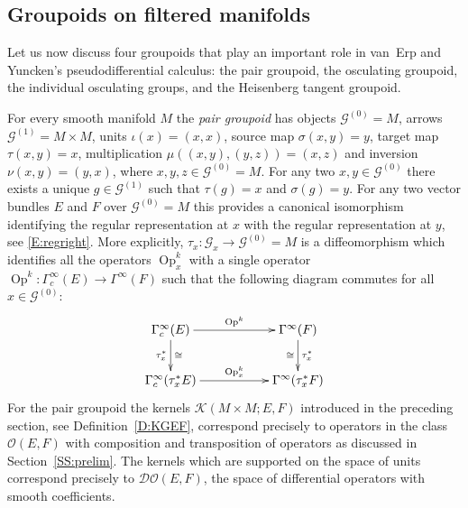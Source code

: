 \documentclass[reqno,12pt]{amsart}
\DeclareMathOperator{\Op}{Op}
\newcommand{\DO}{\mathcal D\mathcal O}
\theoremstyle{plain}
\theoremstyle{definition}
\begin{document}
\subsection{Groupoids on filtered manifolds}






Let us now discuss four groupoids that play an important role in van~Erp and Yuncken's pseudodifferential calculus:
the pair groupoid, the osculating groupoid, the individual osculating groups, and the Heisenberg tangent groupoid.


For every smooth manifold $M$ the \emph{pair groupoid} has objects $\mathcal G^{(0)}=M$, arrows $\mathcal G^{(1)}=M\times M$, units $\iota(x)=(x,x)$, source map $\sigma(x,y)=y$, target map $\tau(x,y)=x$, multiplication $\mu((x,y),(y,z))=(x,z)$ and inversion $\nu(x,y)=(y,x)$, where $x,y,z\in\mathcal G^{(0)}=M$.
For any two $x,y\in\mathcal G^{(0)}$ there exists a unique $g\in\mathcal G^{(1)}$ such that $\tau(g)=x$ and $\sigma(g)=y$.
For any two vector bundles $E$ and $F$ over $\mathcal G^{(0)}=M$ this provides a canonical isomorphism identifying the regular representation at $x$ with the regular representation at $y$, see \eqref{E:regright}.
More explicitly, $\tau_x\colon\mathcal G_x\to\mathcal G^{(0)}=M$ is a diffeomorphism which identifies all the operators $\Op^k_x$ with a single operator $\Op^k\colon\Gamma^\infty_c(E)\to\Gamma^\infty(F)$ such that the following diagram commutes for all $x\in\mathcal G^{(0)}$:
\begin{equation}
\vcenter{
\xymatrix{
\Gamma^\infty_c(E)\ar[rr]^-{\Op^k}\ar[d]^-\cong_-{\tau_x^*}
&&\Gamma^\infty(F)\ar[d]_-\cong^-{\tau_x^*}
\\
\Gamma_c^\infty(\tau_x^*E)\ar[rr]^-{\Op^k_x}
&&\Gamma^\infty(\tau_x^*F)
}}
\end{equation}
For the pair groupoid the kernels $\mathcal K(M\times M;E,F)$ introduced in the preceding section, see Definition~\ref{D:KGEF}, correspond precisely to operators in the class $\mathcal O(E,F)$ with composition and transposition of operators as discussed in Section~\ref{SS:prelim}.
The kernels which are supported on the space of units correspond precisely to $\DO(E,F)$, the space of differential operators with smooth coefficients. 
\end{document}
